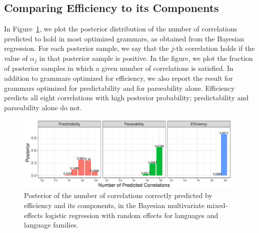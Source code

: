 \documentclass[10pt,twoside,lineno]{article}
\begin{document}
\subsection{Comparing Efficiency to its Components}\label{sec:posterior-number}


In Figure~\ref{fig:posterior}, we plot the posterior distribution of the number of correlations predicted to hold in most optimized grammars, as obtained from the Bayesian regression.
For each posterior sample, we say that the $j$-th correlation holds if the value of $\alpha_j$ in that posterior sample is positive.
In the figure, we plot the fraction of posterior samples in which a given number of correlations is satisfied.
In addition to grammars optimized for efficiency, we also report the result for grammars optimized for predictability and for parseability alone.
Efficiency predicts all eight correlations with high posterior probability; predictability and parseability alone do not.

\begin{figure}[ht]
	\begin{center}
	\includegraphics[width=0.98\textwidth]{../results/correlations/figures/posterior-satisfied-universals-together-large-three.pdf}
	\end{center}
	\caption{Posterior of the number of correlations correctly predicted by efficiency and its components, in the Bayesian multivariate mixed-effects logistic regression with random effects for languages and language families.}\label{fig:posterior}
\end{figure}


%    
%    
%    
\end{document}
